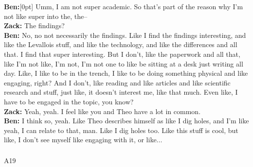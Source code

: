 \documentclass[
]{article}
\makeatletter
\let\oldsubparagraph\subparagraph
\renewcommand{\subparagraph}{
    \@ifstar
      \xxxSubParagraphStar
      \xxxSubParagraphNoStar
  }
\newcommand{\xxxSubParagraphStar}[1]{\oldsubparagraph*{#1}\mbox{}}
\newcommand{\xxxSubParagraphNoStar}[1]{\oldsubparagraph{#1}\mbox{}}
\newcommand{\paragraphnumber}[1]{\marginnote{\color{lightgray}\tiny{#1}}[0pt]}
\makeatother
\begin{document}
\textbf{Ben:}\paragraphnumber{[69]} Umm, I am not super academic. So
that's part of the reason why I'm not like super into the, the--\\
\textbf{Zack:} The findings?\\
\textbf{Ben:} No, no not necessarily the findings. Like I find the
findings interesting, and like the Levallois stuff, and like the
technology, and like the differences and all that. I find that super
interesting. But I don't, like the paperwork and all that, like I'm not
like, I'm not, I'm not one to like be sitting at a desk just writing all
day. Like, I like to be in the trench, I like to be doing something
physical and like engaging, right? And I don't, like reading and like
articles and like scientific research and stuff, just like, it doesn't
interest me, like that much. Even like, I have to be engaged in the
topic, you know?\\
\textbf{Zack:} Yeah, yeah. I feel like you and Theo have a lot in
common.\\
\textbf{Ben:} I think so, yeah. Like Theo describes himself as like I
dig holes, and I'm like yeah, I can relate to that, man. Like I dig
holes too. Like this stuff is cool, but like, I don't see myself like
engaging with it, or like...

\subparagraph{A19}\label{sec-A19}
\end{document}
